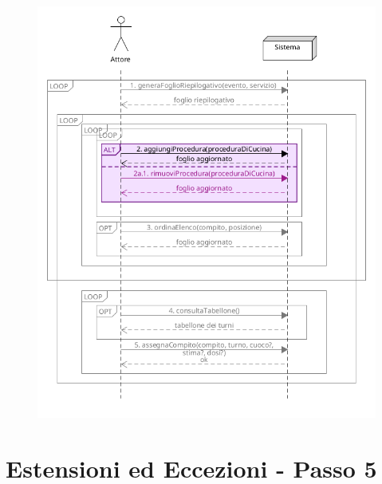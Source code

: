 \begin{figure}[h]
    \begin{center}
      \includegraphics[scale = 0.5]{images/SSD/SSD - Passo 2.png}
    \end{center}
\end{figure}
\pagebreak
\section{Estensioni ed Eccezioni - Passo 5}

